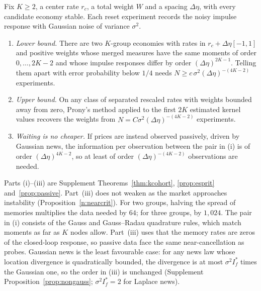 \begin{theorem}\label{n:cost}
Fix $K\ge2$, a center rate $r_c$, a total weight $W$ and a spacing $\Delta\eta$, with every candidate economy stable. Each reset experiment records the noisy impulse response with Gaussian noise of variance $\sigma^2$.
\begin{enumerate}[label=(\roman*),itemsep=1pt]
\item \emph{Lower bound.} There are two $K$-group economies with rates in $r_c+\Delta\eta[-1,1]$ and positive weights whose merged measures have the same moments of order $0,\ldots,2K-2$ and whose impulse responses differ by order $(\Delta\eta)^{2K-1}$. Telling them apart with error probability below $1/4$ needs $N\ge c\,\sigma^2(\Delta\eta)^{-(4K-2)}$ experiments.
\item \emph{Upper bound.} On any class of separated rescaled rates with weights bounded away from zero, Prony's method applied to the first $2K$ estimated kernel values recovers the weights from $N=C\sigma^2(\Delta\eta)^{-(4K-2)}$ experiments.
\item \emph{Waiting is no cheaper.} If prices are instead observed passively, driven by Gaussian news, the information per observation between the pair in (i) is of order $(\Delta\eta)^{4K-2}$, so at least of order $(\Delta\eta)^{-(4K-2)}$ observations are needed.
\end{enumerate}
\end{theorem}

Parts (i)--(iii) are Supplement Theorems~\ref{thm:kcohort}, \ref{prop:esprit} and~\ref{prop:passive}. Part~(iii) does not weaken as the market approaches instability (Proposition~\ref{n:nearcrit}). For two groups, halving the spread of memories multiplies the data needed by $64$; for three groups, by $1{,}024$. The pair in (i) consists of the Gauss and Gauss--Radau quadrature rules, which match moments as far as $K$ nodes allow. Part~(iii) uses that the memory rates are zeros of the closed-loop response, so passive data face the same near-cancellation as probes. Gaussian news is the least favourable case: for any news law whose location divergence is quadratically bounded, the divergence is at most $\sigma^2I^*_f$ times the Gaussian one, so the order in (iii) is unchanged (Supplement Proposition~\ref{prop:nongauss}; $\sigma^2I^*_f=2$ for Laplace news).

